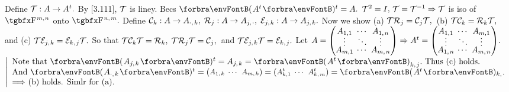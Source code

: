 \def\fT{\mT}\def\fC{\mC}\def\fR{\mR}\def\fP{\mE}

\BulletPointX{}\;\;Define $\fT:A\rightarrow A^t.$ By [3.111], $\fT$ is liney. Becs $\Par{A^t}{^t}=A.$ \TextB{}
$\fT^2=I,\,\fT=\fT^{-1}\Rightarrow \fT$ is iso of $\FbbP{m,\:\!n}$ onto $\FbbP{n,\;\!m}.$ \;Define $\fC_k:A\rightarrow A_{\cdot,\;\!k},\;\fR_j:A\rightarrow A_{j,\;\!\cdot},\;\fP_{j,\;\!k}:A\rightarrow A_{j,\;\!k}.$\TextB{}
Now we show (a) \uline{$\fT\fR_j=\fC_j\fT,$} \,(b) \uline{$\fT\fC_k=\fR_k\fT,$} \,and (c) \uline{$\fT\fP_{j,\;\!k}=\fP_{k,\;\!j}\fT.$}\TextB{\vspace{2pt}}
So that $\fT\fC_k\fT=\fR_k,\;\fT\fR_j\fT=\fC_j,$ \,and $\fT\fP_{j,\;\!k}\fT=\fP_{k,\;\!j}.$\TextB{\vspace{2pt}}
Let $A={}{\normalsize\begin{pmatrix}A_{1,1} &\hspace{-6pt} \cdots &\hspace{-6pt} A_{1,\;\!n}\\[-4pt] \vdots &\hspace{-6pt} \ddots &\hspace{-6pt} \vdots\\[-4pt] A_{m,1} &\hspace{-6pt} \cdots &\hspace{-6pt} A_{m,\;\!n}\end{pmatrix}}\Rightarrow A^t={}{\normalsize\begin{pmatrix}A_{1,1} &\hspace{-6pt} \cdots &\hspace{-6pt} A_{m,1}\\[-4pt] \vdots &\hspace{-6pt} \ddots &\hspace{-6pt} \vdots\\[-4pt] A_{1,\;\!n} &\hspace{-6pt} \cdots &\hspace{-6pt} A_{m,\;\!n}\end{pmatrix}}.$ \;$\MathLeftMid{l}{\!\!$
Note that $\Par{A_{j,\;\!k}}{^t}=A_{j,\;\!k}=\Par{A^t}_{k,\;\!j}.$ Thus (c) holds.$\\$
\!\!And $\Par{A_{\cdot,\;\!k}}{^t}={}{\small\begin{pmatrix}A_{1,\;\!k} &\hspace{-6pt} \cdots &\hspace{-6pt}A_{m,\;\!k}\end{pmatrix}}{}={}{\small\begin{pmatrix}A^t_{k,1} &\hspace{-6pt} \cdots &\hspace{-6pt}A^t_{k,\;\!m}\end{pmatrix}}{}=\Par{A^t}{_{k,\;\!\cdot}}\\$
\!\!$\Longrightarrow$ (b) holds. Simlr for (a).$}$\par\vspace{10pt}
\SepLine

